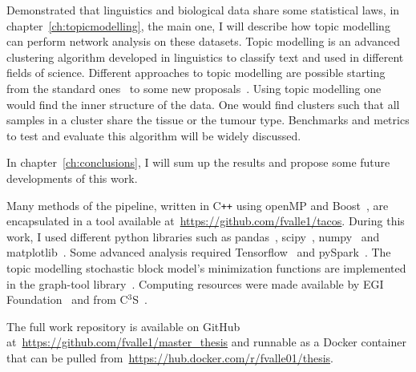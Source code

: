 Demonstrated that linguistics and biological data share some statistical laws, in chapter~\ref{ch:topicmodelling}, the main one, I will describe how topic modelling can perform network analysis on these datasets. Topic modelling is an advanced clustering algorithm developed in linguistics to classify text and used in different fields of science. Different approaches to topic modelling are possible starting from the standard ones~\cite{Zhou2016} to some new proposals~\cite{Lancichinetti2015,Martini2017,gerlach2018network}. Using topic modelling one would find the inner structure of the data. One would find clusters such that all samples in a cluster share the tissue or the tumour type. Benchmarks and metrics to test and evaluate this algorithm will be widely discussed.

In chapter~\ref{ch:conclusions}, I will sum up the results and propose some future developments of this work.

Many methods of the pipeline, written in C\texttt{++} using openMP and Boost~\cite{siek2002boost}, are encapsulated in a tool available at~\url{https://github.com/fvalle1/tacos}. During this work, I used different python libraries such as pandas~\cite{mckinney2010data}, scipy~\cite{jones2014scipy}, numpy~\cite{oliphant2006guide} and matplotlib~\cite{hunter2007matplotlib}. Some advanced analysis required Tensorflow~\cite{tensorflow2015-whitepaper} and pySpark~\cite{Zaharia:2016:ASU:3013530.2934664}. The topic modelling stochastic block model's minimization functions are implemented in the graph-tool library~\cite{peixoto_graph-tool_2014}. Computing resources were made available by EGI Foundation~\cite{fernandez2015egi} and from C$^{\text{3}}$S~\cite{occamchep}.

The full work repository is available on GitHub\textsuperscript{\tiny\textcopyright} at~\url{https://github.com/fvalle1/master_thesis} and runnable as a Docker\textsuperscript{\tiny\textcopyright} container that can be pulled from~\url{https://hub.docker.com/r/fvalle01/thesis}. 